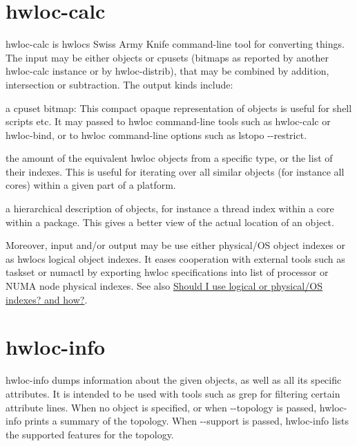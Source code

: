  \hypertarget{a00381_cli_hwloc_calc}{}\section{hwloc-\/calc}\label{a00381_cli_hwloc_calc}
hwloc-\/calc is hwloc\textquotesingle{}s Swiss Army Knife command-\/line tool for converting things. The input may be either objects or cpusets (bitmaps as reported by another hwloc-\/calc instance or by hwloc-\/distrib), that may be combined by addition, intersection or subtraction. The output kinds include\+: 
\begin{DoxyItemize}
\item a cpuset bitmap\+: This compact opaque representation of objects is useful for shell scripts etc. It may passed to hwloc command-\/line tools such as hwloc-\/calc or hwloc-\/bind, or to hwloc command-\/line options such as {\ttfamily lstopo -\/-\/restrict}. 
\item the amount of the equivalent hwloc objects from a specific type, or the list of their indexes. This is useful for iterating over all similar objects (for instance all cores) within a given part of a platform. 
\item a hierarchical description of objects, for instance a thread index within a core within a package. This gives a better view of the actual location of an object. 
\end{DoxyItemize}

Moreover, input and/or output may be use either physical/\+OS object indexes or as hwloc\textquotesingle{}s logical object indexes. It eases cooperation with external tools such as taskset or numactl by exporting hwloc specifications into list of processor or N\+U\+MA node physical indexes. See also \hyperlink{a00394_faq_indexes}{Should I use logical or physical/\+OS indexes? and how?}.

 \hypertarget{a00381_cli_hwloc_info}{}\section{hwloc-\/info}\label{a00381_cli_hwloc_info}
hwloc-\/info dumps information about the given objects, as well as all its specific attributes. It is intended to be used with tools such as grep for filtering certain attribute lines. When no object is specified, or when {\ttfamily -\/-\/topology} is passed, hwloc-\/info prints a summary of the topology. When {\ttfamily -\/-\/support} is passed, hwloc-\/info lists the supported features for the topology.

